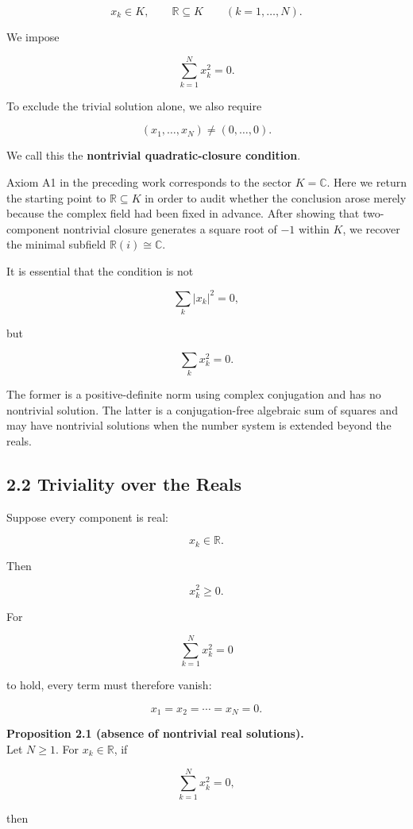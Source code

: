 \documentclass[
  a4paper,
  10pt]{article}
\begin{document}
\[
x_k\in K,
\qquad
\mathbb R\subseteq K
\qquad(k=1,\ldots,N).
\]

We impose

\[
\boxed{
\sum_{k=1}^{N}x_k^2=0
}.
\]

To exclude the trivial solution alone, we also require

\[
\boxed{
(x_1,\ldots,x_N)\neq(0,\ldots,0)
}.
\]

We call this the \textbf{nontrivial quadratic-closure condition}.

Axiom A1 in the preceding work corresponds to the sector
\(K=\mathbb C\). Here we return the starting point to
\(\mathbb R\subseteq K\) in order to audit whether the conclusion arose
merely because the complex field had been fixed in advance. After
showing that two-component nontrivial closure generates a square root of
\(-1\) within \(K\), we recover the minimal subfield
\(\mathbb R(i)\cong\mathbb C\).

It is essential that the condition is not

\[
\sum_k|x_k|^2=0,
\]

but

\[
\sum_kx_k^2=0.
\]

The former is a positive-definite norm using complex conjugation and has
no nontrivial solution. The latter is a conjugation-free algebraic sum
of squares and may have nontrivial solutions when the number system is
extended beyond the reals.

\subsection{2.2 Triviality over the
Reals}\label{22-triviality-over-the-reals}

Suppose every component is real:

\[
x_k\in\mathbb R.
\]

Then

\[
x_k^2\ge0.
\]

For

\[
\sum_{k=1}^{N}x_k^2=0
\]

to hold, every term must therefore vanish:

\[
x_1=x_2=\cdots=x_N=0.
\]

\textbf{Proposition 2.1 (absence of nontrivial real solutions).}\\
Let \(N\ge1\). For \(x_k\in\mathbb R\), if

\[
\sum_{k=1}^{N}x_k^2=0,
\]

then
\end{document}
